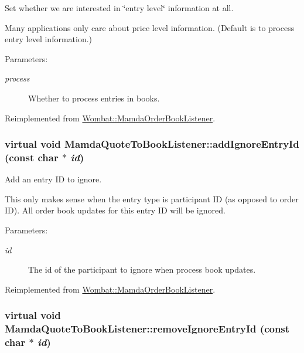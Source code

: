 Set whether we are interested in \char`\"{}entry level\char`\"{} information at all. 

Many applications only care about price level information. (Default is to process entry level information.)

\begin{Desc}
\item[Parameters:]
\begin{description}
\item[{\em process}]Whether to process entries in books. \end{description}
\end{Desc}


Reimplemented from \hyperlink{classWombat_1_1MamdaOrderBookListener_318470f5c5cf4e2873f470610631145f}{Wombat::Mamda\-Order\-Book\-Listener}.\hypertarget{classMamdaQuoteToBookListener_fbd741a8aff801ccb953cf7e5056a359}{
\subsubsection[addIgnoreEntryId]{\setlength{\rightskip}{0pt plus 5cm}virtual void Mamda\-Quote\-To\-Book\-Listener::add\-Ignore\-Entry\-Id (const char $\ast$ {\em id})}}
\label{classMamdaQuoteToBookListener_fbd741a8aff801ccb953cf7e5056a359}


Add an entry ID to ignore. 

This only makes sense when the entry type is participant ID (as opposed to order ID). All order book updates for this entry ID will be ignored.

\begin{Desc}
\item[Parameters:]
\begin{description}
\item[{\em id}]The id of the participant to ignore when process book updates. \end{description}
\end{Desc}


Reimplemented from \hyperlink{classWombat_1_1MamdaOrderBookListener_1d3802c30ebd8939435f74a634dc11fc}{Wombat::Mamda\-Order\-Book\-Listener}.\hypertarget{classMamdaQuoteToBookListener_e16ce5ea6ee98985543df7c93cea61f9}{
\subsubsection[removeIgnoreEntryId]{\setlength{\rightskip}{0pt plus 5cm}virtual void Mamda\-Quote\-To\-Book\-Listener::remove\-Ignore\-Entry\-Id (const char $\ast$ {\em id})}}
\label{classMamdaQuoteToBookListener_e16ce5ea6ee98985543df7c93cea61f9}


